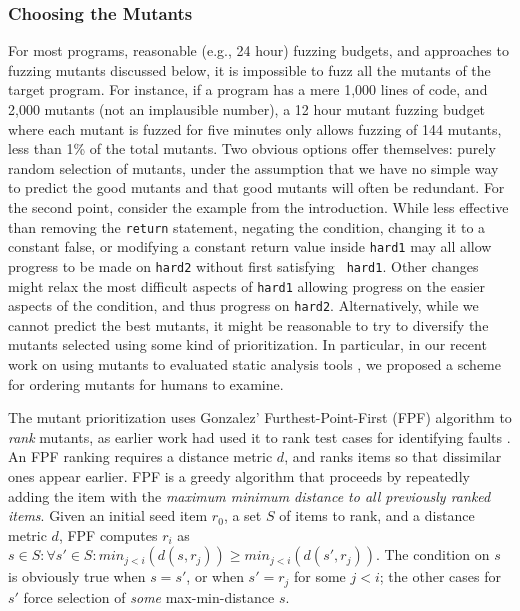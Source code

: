 \subsubsection{Choosing the Mutants}

For most programs, reasonable (e.g., 24 hour) fuzzing budgets, and
approaches to fuzzing mutants discussed below, it is impossible to
fuzz all the mutants of the target program.  For instance, if a
program has a mere 1,000 lines of code, and 2,000 mutants (not an
implausible number), a 12 hour mutant fuzzing budget where each mutant
is fuzzed for five minutes only allows fuzzing of 144 mutants, less
than 1\% of the total mutants.  Two obvious options offer themselves:
purely random selection of mutants, under the assumption that we have
no simple way to predict the good mutants and that good mutants will
often be redundant.  For the second point, consider the example from
the introduction.  While less effective than removing the {\tt return}
statement, negating the condition, changing it to a constant false, or
modifying a constant return value inside {\tt hard1} may all allow
progress to be made on {\tt hard2} without first satisfying {\tt
  hard1}.  Other changes might relax the most difficult aspects of
{\tt hard1} allowing progress on the easier aspects of the condition,
and thus progress on {\tt hard2}.  Alternatively, while we cannot
predict the best mutants, it might be reasonable to try to diversify
the mutants selected using some kind of prioritization.  In
particular, in our recent work on using mutants to evaluated static
analysis tools \cite{QRS2021}, we proposed a scheme for ordering
mutants for humans to examine.  

The mutant prioritization
uses Gonzalez' Furthest-Point-First \cite{Gonzalez} (FPF) algorithm
to \emph{rank} mutants, as earlier work had used it to rank test cases for identifying faults \cite{PLDI13}.
An
FPF ranking requires a distance metric $d$, and ranks items so that
dissimilar ones appear earlier.  FPF is a
greedy algorithm that proceeds by repeatedly adding the item with the
\emph{maximum minimum distance to all previously ranked items}. Given an
initial seed item $r_0$, a set $S$ of items to rank, and a distance
metric $d$, FPF computes $r_i$ as
$s \in S: \forall s' \in S: min_{ j < i}(d(s,r_j)) \geq min_{j <
  i}(d(s',r_j))$.  The condition on $s$ is obviously true when
$s = s'$, or when $s' = r_j$ for some $j < i$; the other cases for
$s'$ force selection of \emph{some}
max-min-distance $s$.


